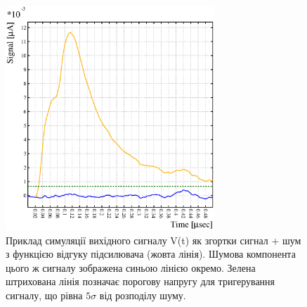 \documentclass[pdftex,14pt]{scrartcl}
\begin{document}
	

	\begin{figure}[h!]
	\centering
	\includegraphics[width=0.7\textwidth]{signal_noise_threshold.eps}
	\caption{Приклад симуляції вихідного сигналу V(t) як згортки сигнал + шум з функцією відгуку підсилювача (жовта лінія). Шумова компонента цього ж сигналу зображена синьою лінією окремо. Зелена штрихована лінія позначає порогову напругу для тригерування сигналу, що рівна $5\sigma$ від розподілу шуму. }
	\label{fig:signal_example}
	\end{figure}
	
\end{document}

